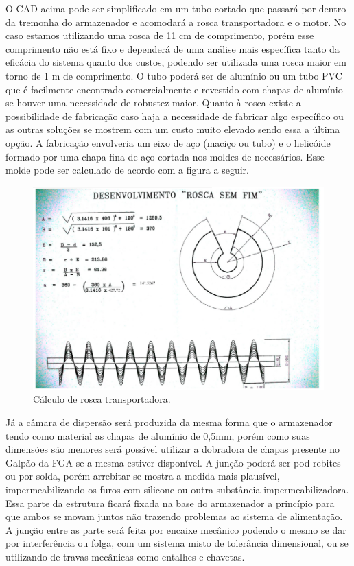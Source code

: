 O CAD acima pode ser simplificado em um tubo cortado que passará por dentro da tremonha do armazenador e acomodará a rosca transportadora e o motor. No caso estamos utilizando uma rosca de 11 cm de comprimento, porém esse comprimento não está fixo e dependerá de uma análise mais específica tanto da eficácia do sistema quanto dos custos, podendo ser utilizada uma rosca maior em torno de 1 m de comprimento. O tubo poderá ser de alumínio ou um tubo PVC que é facilmente encontrado comercialmente e revestido com chapas de alumínio se houver uma necessidade de robustez maior. Quanto à rosca existe a possibilidade de fabricação caso haja a necessidade de fabricar algo específico ou as outras soluções se mostrem com  um custo muito elevado sendo essa a última opção. A fabricação envolveria um eixo de aço (maciço ou tubo) e o helicóide formado por uma chapa fina de aço cortada nos moldes de necessários. Esse molde pode ser calculado de acordo com a figura a seguir.

\begin{figure}[H]
 \centering
   \includegraphics[keepaspectratio=true,scale=0.8]{figuras/calculo_de_roca.eps}
 \caption{Cálculo de rosca transportadora.}
 \label{calculo_rosca}
\end{figure}

Já a câmara de dispersão será produzida da mesma forma que o armazenador tendo como material as chapas de alumínio de 0,5mm, porém como suas dimensões são menores será possível utilizar a dobradora de chapas presente no Galpão da FGA se a mesma estiver disponível. A junção poderá ser pod rebites ou por solda, porém arrebitar se mostra a medida mais plausível, impermeabilizando os furos com silicone ou outra substância impermeabilizadora. Essa parte da estrutura ficará fixada na base do armazenador a princípio para que ambos se movam juntos não trazendo problemas ao sistema de alimentação. A junção entre as parte será feita por encaixe mecânico podendo o mesmo se dar por interferência ou folga, com um sistema misto de tolerância dimensional, ou se utilizando de travas mecânicas como entalhes e chavetas.

